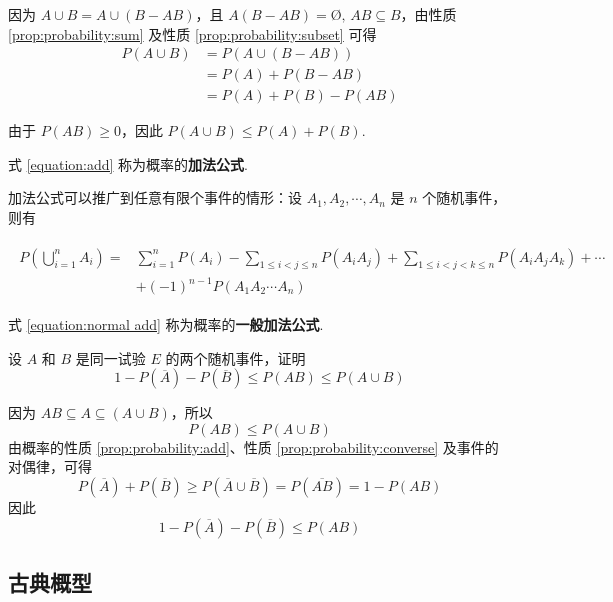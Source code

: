 \begin{myproof}
    因为 $A \cup B = A \cup (B-AB)$，且 $A(B-AB)=\text{\O},\, AB \subseteq B$，由性质 \ref*{prop:probability:sum} 及性质 \ref*{prop:probability:subset} 可得
    $$
    \begin{aligned}
        P(A \cup B) &= P(A \cup (B-AB))\\
        &= P(A) + P(B-AB)\\
        &= P(A) + P(B) - P(AB)
    \end{aligned}
    $$

    由于 $P(AB)\geqslant 0$，因此 $P(A \cup B) \leqslant P(A) + P(B)$.
\end{myproof}

式 \eqref{equation:add} 称为概率的\textbf{加法公式}.

加法公式可以推广到任意有限个事件的情形：设 $A_1,A_2,\cdots,A_n$ 是 $n$ 个随机事件，则有

\begin{align} \label{equation:normal add}
    \begin{split}
        P(\bigcup_{i=1}^n A_i) = & \sum_{i=1}^n P(A_i) - \sum_{1 \leqslant i<j \leqslant n} P(A_i A_j) + \sum_{1 \leqslant i<j<k \leqslant n} P(A_i A_j A_k) + \cdots\\
        & + (-1)^{n-1} P(A_1 A_2 \cdots A_n)
    \end{split}
\end{align}

式 \eqref{equation:normal add} 称为概率的\textbf{一般加法公式}.

\begin{problem}
    设 $A$ 和 $B$ 是同一试验 $E$ 的两个随机事件，证明
    $$
    1 - P(\overline{A}) - P(\overline{B}) \leqslant P(AB) \leqslant P(A \cup B)
    $$
\end{problem}

\begin{myproof}
    因为 $AB \subseteq A \subseteq (A \cup B)$，所以
    $$
    P(AB) \leqslant P(A \cup B)
    $$
    由概率的性质 \ref*{prop:probability:add}、性质 \ref*{prop:probability:converse} 及事件的对偶律，可得
    $$
    P(\overline{A}) + P(\overline{B}) \geqslant P(\overline{A} \cup \overline{B}) = P(\overline{AB}) = 1 - P(AB)
    $$
    因此
    $$
    1 - P(\overline{A}) - P(\overline{B}) \leqslant P(AB)
    $$
\end{myproof}

\subsection{古典概型}

